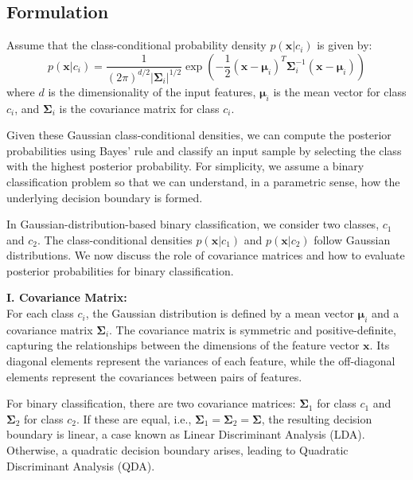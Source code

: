 \documentclass[12pt]{article}
\begin{document}
\subsection{Formulation}
Assume that the class-conditional probability density \(p(\bm{x} | c_i)\) is given by:
\begin{equation}
p(\bm{x} | c_i) = \frac{1}{(2\pi)^{d/2}|\bm{\Sigma}_i|^{1/2}}\exp\left(-\frac{1}{2}(\bm{x} - \bm{\mu}_i)^T \bm{\Sigma}_i^{-1} (\bm{x} - \bm{\mu}_i)\right)
\end{equation}
where \(d\) is the dimensionality of the input features, \(\bm{\mu}_i\) is the mean vector for class \(c_i\), and \(\bm{\Sigma}_i\) is the covariance matrix for class \(c_i\).

Given these Gaussian class-conditional densities, we can compute the posterior probabilities using Bayes' rule and classify an input sample by selecting the class with the highest posterior probability. For simplicity, we assume a binary classification problem so that we can understand, in a parametric sense, how the underlying decision boundary is formed.

In Gaussian-distribution-based binary classification, we consider two classes, \(c_1\) and \(c_2\). The class-conditional densities \(p(\bm{x} | c_1)\) and \(p(\bm{x} | c_2)\) follow Gaussian distributions. We now discuss the role of covariance matrices and how to evaluate posterior probabilities for binary classification.

\textbf{I. Covariance Matrix:} \\
For each class \(c_i\), the Gaussian distribution is defined by a mean vector \(\bm{\mu}_i\) and a covariance matrix \(\bm{\Sigma}_i\). The covariance matrix is symmetric and positive-definite, capturing the relationships between the dimensions of the feature vector \(\bm{x}\). Its diagonal elements represent the variances of each feature, while the off-diagonal elements represent the covariances between pairs of features.

For binary classification, there are two covariance matrices: \(\bm{\Sigma}_1\) for class \(c_1\) and \(\bm{\Sigma}_2\) for class \(c_2\). If these are equal, i.e., \(\bm{\Sigma}_1 = \bm{\Sigma}_2 = \bm{\Sigma}\), the resulting decision boundary is linear, a case known as Linear Discriminant Analysis (LDA). Otherwise, a quadratic decision boundary arises, leading to Quadratic Discriminant Analysis (QDA).
\end{document}

